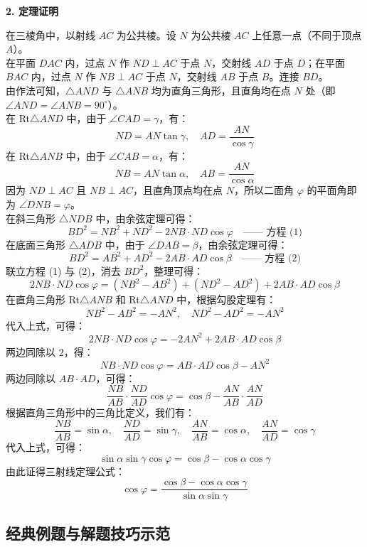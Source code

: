 \documentclass[11pt,a4paper]{ctexart}
\begin{document}
\noindent\textbf{2. 定理证明}\par
在三棱角中，以射线 $AC$ 为公共棱。设 $N$ 为公共棱 $AC$ 上任意一点（不同于顶点 $A$）。\\
在平面 $DAC$ 内，过点 $N$ 作 $ND \perp AC$ 于点 $N$，交射线 $AD$ 于点 $D$；在平面 $BAC$ 内，过点 $N$ 作 $NB \perp AC$ 于点 $N$，交射线 $AB$ 于点 $B$。连接 $BD$。\\
由作法可知，$\triangle AND$ 与 $\triangle ANB$ 均为直角三角形，且直角均在点 $N$ 处（即 $\angle AND = \angle ANB = 90^\circ$）。\\
在 Rt$\triangle AND$ 中，由于 $\angle CAD = \gamma$，有：
\[ ND = AN \tan\gamma, \quad AD = \frac{AN}{\cos\gamma} \]
在 Rt$\triangle ANB$ 中，由于 $\angle CAB = \alpha$，有：
\[ NB = AN \tan\alpha, \quad AB = \frac{AN}{\cos\alpha} \]
因为 $ND \perp AC$ 且 $NB \perp AC$，且直角顶点均在点 $N$，所以二面角 $\varphi$ 的平面角即为 $\angle DNB = \varphi$。\\
在斜三角形 $\triangle NDB$ 中，由余弦定理可得：
\[ BD^2 = NB^2 + ND^2 - 2 NB \cdot ND \cos\varphi \quad \text{—— 方程 (1)} \]
在底面三角形 $\triangle ADB$ 中，由于 $\angle DAB = \beta$，由余弦定理可得：
\[ BD^2 = AB^2 + AD^2 - 2 AB \cdot AD \cos\beta \quad \text{—— 方程 (2)} \]
联立方程 (1) 与 (2)，消去 $BD^2$，整理可得：
\[ 2 NB \cdot ND \cos\varphi = (NB^2 - AB^2) + (ND^2 - AD^2) + 2 AB \cdot AD \cos\beta \]
在直角三角形 Rt$\triangle ANB$ 和 Rt$\triangle AND$ 中，根据勾股定理有：
\[ NB^2 - AB^2 = -AN^2, \quad ND^2 - AD^2 = -AN^2 \]
代入上式，可得：
\[ 2 NB \cdot ND \cos\varphi = -2 AN^2 + 2 AB \cdot AD \cos\beta \]
两边同除以 $2$，得：
\[ NB \cdot ND \cos\varphi = AB \cdot AD \cos\beta - AN^2 \]
两边同除以 $AB \cdot AD$，可得：
\[ \frac{NB}{AB} \cdot \frac{ND}{AD} \cos\varphi = \cos\beta - \frac{AN}{AB} \cdot \frac{AN}{AD} \]
根据直角三角形中的三角比定义，我们有：
\[ \frac{NB}{AB} = \sin\alpha, \quad \frac{ND}{AD} = \sin\gamma, \quad \frac{AN}{AB} = \cos\alpha, \quad \frac{AN}{AD} = \cos\gamma \]
代入上式，可得：
\[ \sin\alpha \sin\gamma \cos\varphi = \cos\beta - \cos\alpha \cos\gamma \]
由此证得三射线定理公式：
\[ \cos\varphi = \frac{\cos\beta - \cos\alpha \cos\gamma}{\sin\alpha \sin\gamma} \]


\subsection{经典例题与解题技巧示范}
\end{document}
